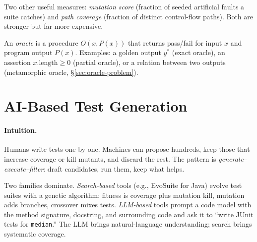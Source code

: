 Two other useful measures: \emph{mutation score} (fraction of seeded artificial faults a suite catches) and \emph{path coverage} (fraction of distinct control-flow paths). Both are stronger but far more expensive.

\begin{definition}[Oracle]
An \emph{oracle} is a procedure $O(x, P(x))$ that returns pass/fail for input $x$ and program output $P(x)$. Examples: a golden output $y^*$ (exact oracle), an assertion $x.\text{length} \ge 0$ (partial oracle), or a relation between two outputs (metamorphic oracle, \S\ref{sec:oracle-problem}).
\end{definition}

\section{AI-Based Test Generation}
\label{sec:ai-test-gen}
\paragraph{Intuition.} Humans write tests one by one. Machines can propose hundreds, keep those that increase coverage or kill mutants, and discard the rest. The pattern is \emph{generate--execute--filter}: draft candidates, run them, keep what helps.

Two families dominate. \emph{Search-based} tools (e.g., EvoSuite for Java) evolve test suites with a genetic algorithm: fitness is coverage plus mutation kill, mutation adds branches, crossover mixes tests. \emph{LLM-based} tools prompt a code model with the method signature, docstring, and surrounding code and ask it to ``write JUnit tests for \texttt{median}.'' The LLM brings natural-language understanding; search brings systematic coverage.

